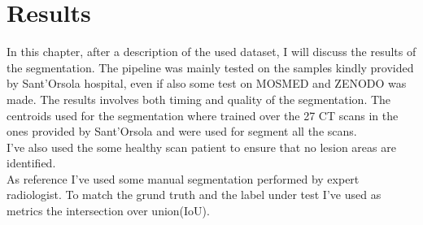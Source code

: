 \documentclass{standalone}
\begin{document}
	\chapter{Results}
	
	In this chapter, after a description of the used dataset, I will discuss the results of the segmentation. The pipeline was mainly tested on the samples kindly provided by Sant'Orsola hospital, even if also some test on MOSMED and ZENODO was made. The results involves both timing and quality of the segmentation. The centroids used for the segmentation where trained over the 27 CT scans in the ones provided by Sant'Orsola and were used for segment all the scans.\\
	I've also used the some healthy scan patient to ensure that no lesion areas are identified.\\
	As reference I've used some manual segmentation performed by expert radiologist. To match the grund truth and the label under test I've used as metrics the intersection over union(IoU).\\ 
\end{document}

